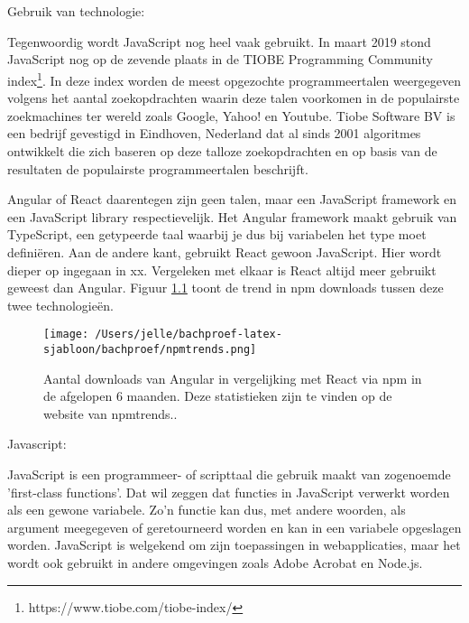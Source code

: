 \chapter{}
\label{ch:stand-van-zaken}



Gebruik van technologie:

Tegenwoordig wordt JavaScript nog heel vaak gebruikt. In maart 2019 stond JavaScript nog op de zevende plaats in de TIOBE Programming Community index\footnote{https://www.tiobe.com/tiobe-index/}. In deze index worden de meest opgezochte programmeertalen weergegeven volgens het aantal zoekopdrachten waarin deze talen voorkomen in de populairste zoekmachines ter wereld zoals Google, Yahoo! en Youtube. Tiobe Software BV is een bedrijf gevestigd in Eindhoven, Nederland dat al sinds 2001 algoritmes ontwikkelt die zich baseren op deze talloze zoekopdrachten en op basis van de resultaten de populairste programmeertalen beschrijft. \autocite{Redondo2017}

Angular of React daarentegen zijn geen talen, maar een JavaScript framework en een JavaScript library respectievelijk. Het Angular framework maakt gebruik van TypeScript, een getypeerde taal waarbij je dus bij variabelen het type moet definiëren. Aan de andere kant, gebruikt React gewoon JavaScript. Hier wordt dieper op ingegaan in xx. Vergeleken met elkaar is React altijd meer gebruikt geweest dan Angular. Figuur \ref{fig:a} toont de trend in npm downloads tussen deze twee technologieën. \autocite{Hamedani2018}
	\begin{figure}
		\centering
		\texttt{[image: /Users/jelle/bachproef-latex-sjabloon/bachproef/npmtrends.png]}
		\caption{Aantal downloads van Angular in vergelijking met React via npm in de afgelopen 6 maanden. Deze statistieken zijn te vinden op de website van npmtrends.\protect\footnotemark. }
		\label{fig:a}
	\end{figure}

Javascript:

JavaScript is een programmeer- of scripttaal die gebruik maakt van zogenoemde 'first-class functions'. Dat wil zeggen dat functies in JavaScript verwerkt worden als een gewone variabele. Zo'n functie kan dus, met andere woorden, als argument meegegeven of geretourneerd worden en kan in een variabele opgeslagen worden. JavaScript is welgekend om zijn toepassingen in webapplicaties, maar het wordt ook gebruikt in andere omgevingen zoals Adobe Acrobat en Node.js. \autocite{Alexiou2017}

